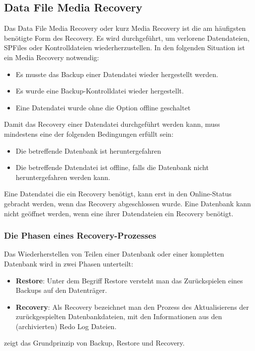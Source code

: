       \subsection{Data File Media Recovery}
        Das Data File Media Recovery oder kurz Media Recovery ist die am h\"aufigsten ben\"otigte Form des Recovery. Es wird durchgef\"uhrt, um verlorene Datendateien, SPFiles oder Kontrolldateien wiederherzustellen. In den folgenden Situation ist ein Media Recovery notwendig:
        \begin{itemize}
          \item Es musste das Backup einer Datendatei wieder hergestellt werden.
          \item Es wurde eine Backup-Kontrolldatei wieder hergestellt.
          \item Eine Datendatei wurde ohne die Option  offline geschaltet
        \end{itemize}
        Damit das Recovery einer Datendatei durchgef\"uhrt werden kann, muss mindestens eine der folgenden Bedingungen erf\"ullt sein:
        \begin{itemize}
          \item Die betreffende Datenbank ist heruntergefahren
          \item Die betreffende Datendatei ist offline, falls die Datenbank nicht heruntergefahren werden kann.
        \end{itemize}
        Eine Datendatei die ein Recovery ben\"otigt, kann erst in den Online-Status gebracht werden, wenn das Recovery abgeschlossen wurde. Eine Datenbank kann nicht ge\"offnet werden, wenn eine ihrer Datendateien ein Recovery ben\"otigt.
        \subsubsection{Die Phasen eines Recovery-Prozesses}
          Das Wiederherstellen von Teilen einer Datenbank oder einer kompletten Datenbank wird in zwei Phasen unterteilt:
          \begin{itemize}
            \item \textbf{Restore}: Unter dem Begriff Restore versteht man das Zur\"uckspielen eines Backups auf den Datentr\"ager.
            \item \textbf{Recovery}: Als Recovery bezeichnet man den Prozess des Aktualisierens der zu\-r\"uck\-ge\-spielten Datenbank\-dateien, mit den Informationen aus den (archivierten) Redo Log Dateien.
          \end{itemize}
           zeigt das Grundprinzip von Backup, Restore und Recovery.

